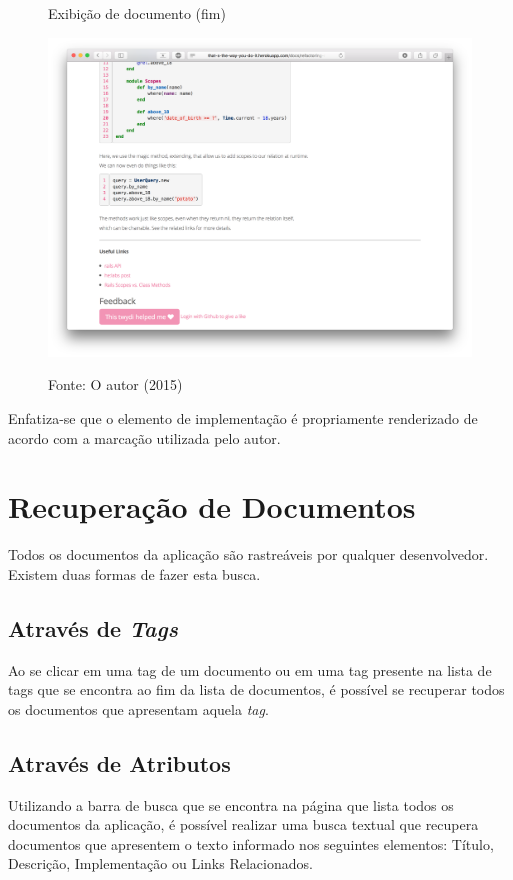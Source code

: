 \begin{figure}[h]
	\centering
    \caption{Exibição de documento (fim)}
    \includegraphics[width=15cm]{Imagens/print-show-3.png}
    \label{fig:doc-show-3}
	\caption*{Fonte: O autor (2015)}
\end{figure}

Enfatiza-se que o elemento de implementação é propriamente renderizado de acordo com a marcação utilizada pelo autor.

\section{Recuperação de Documentos}

Todos os documentos da aplicação são rastreáveis por qualquer desenvolvedor. Existem duas formas de fazer esta busca.

\subsection{Através de \textit{Tags}}

Ao se clicar em uma tag de um documento ou em uma tag presente na lista de tags que se encontra ao fim da lista de documentos, é possível se recuperar todos os documentos que apresentam aquela \textit{tag}.

\subsection{Através de Atributos}

Utilizando a barra de busca que se encontra na página que lista todos os documentos da aplicação, é possível realizar uma busca textual que recupera documentos que apresentem o texto informado nos seguintes elementos: Título, Descrição, Implementação ou Links Relacionados.

